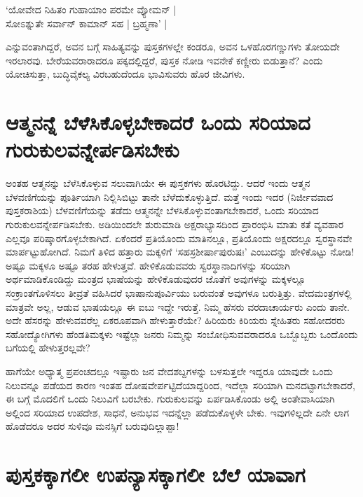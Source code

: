 \begin{shloka}
`ಯೋವೇದ ನಿಹಿತಂ ಗುಹಾಯಾಂ ಪರಮೇ ವ್ಯೋಮನ್ |\label{108}\\
ಸೋಽಶ್ನುತೇ ಸರ್ವಾನ್ ಕಾಮಾನ್ ಸಹ | ಬ್ರಹ್ಮಣಾ' |
\end{shloka}
ಎನ್ನುವಂತಾಗಿದ್ದರೆ, ಅವನ ಬಗ್ಗೆ ಸಾಹಿತ್ಯವನ್ನು ಪುಸ್ತಕಗಳಲ್ಲೇ ಕಂಡರೂ, ಅವನ ಒಳಹೊರಗಣ್ಣುಗಳು ತೋಯದೇ ಇರಲಾರವು. ಬೇರೆಯವರಾರಾದರೂ ಪಕ್ಕದಲ್ಲಿದ್ದರೆ, ಪುಸ್ತಕ ನೋಡಿ ಇವನೇಕೆ ಕಣ್ಣೀರು ಬಿಡುತ್ತಾನೆ? ಎಂದು ಯೋಚಿಸುತ್ತಾ, ಬುದ್ಧಿವೈಕಲ್ಯ ವಿರಬಹುದೆಂದೂ ಭಾವಿಸುವರು ಹೊರ ಜೀವಿಗಳು.

\section*{ಆತ್ಮನನ್ನೆ ಬೆಳೆಸಿಕೊಳ್ಳಬೇಕಾದರೆ ಒಂದು ಸರಿಯಾದ ಗುರುಕುಲವನ್ನೇರ್ಪಡಿಸಬೇಕು}

ಅಂತಹ ಆತ್ಮನನ್ನು ಬೆಳೆಸಿಕೊಳ್ಳುವ ಸಲುವಾಗಿಯೇ ಈ ಪುಸ್ತಕಗಳು ಹೊರಟಿದ್ದು. ಆದರೆ ಇಂದು ಆತ್ಮನ ಬೆಳವಣಿಗೆಯನ್ನು ಪೂರ್ತಿಯಾಗಿ ನಿಲ್ಲಿಸಿಬಿಟ್ಟು ತಾನೇ ಬೆಳೆದುಕೊಳ್ಳುತ್ತಿದೆ. ಮತ್ತೆ ಇಂದು ಇದರ (ನಿರ್ಜೀವವಾದ ಪುಸ್ತಕರಾಶಿಯ) ಬೆಳವಣಿಗೆಯನ್ನು ತಡೆದು ಆತ್ಮನನ್ನೇ ಬೆಳಸಿಕೊಳ್ಳುವಂತಾಗಬೇಕಾದರೆ, ಒಂದು ಸರಿಯಾದ ಗುರುಕುಲವನ್ನೇರ್ಪಡಿಸಬೇಕು. ಅಡಿಯಿಂದಲೇ ಶುರುಮಾಡಿ ಅಕ್ಷರಾಭ್ಯಾಸದಿಂದ ಪ್ರಾರಂಭಿಸಿ ಮಾತು ಕತೆ ವ್ಯವಹಾರ ಎಲ್ಲವೂ ಪರಿಷ್ಕಾರಗೊಳ್ಳಬೇಕಾಗಿದೆ. ಏಕೆಂದರೆ ಪ್ರತಿಯೊಂದು ಮಾತಿನಲ್ಲೂ, ಪ್ರತಿಯೊಂದು ಅಕ್ಷರದಲ್ಲೂ ಸ್ವರಸ್ಥಾನವೇ ಮಾರ್ಪಟ್ಟುಹೋಗಿದೆ. ನಿಮಗೆ ತಿಳಿದ ಹತ್ತಾರು ಮಕ್ಕಳಿಗೆ `ಸಹಸ್ರಶೀರ್ಷಾಪುರುಷಃ' ಎಂಬುದನ್ನು ಹೇಳಿಕೊಟ್ಟು ನೋಡಿ! ಅಷ್ಟೂ ಮಕ್ಕಳೂ ಅಷ್ಟೂ ತರಹ ಹೇಳುತ್ತವೆ. ಹೇಳಿಕೊಡುವವರು ಸ್ವರಸ್ಥಾನಾದಿಗಳನ್ನು ಸರಿಯಾಗಿ ಅರ್ಥಮಾಡಿಕೊಂಡಿದ್ದು ಮಂತ್ರದ ಭಾಷೆಯನ್ನು ಹೇಳಿಕೊಡುವುದರ ಜೊತೆಗೆ ಅವುಗಳನ್ನು ಮಕ್ಕಳಲ್ಲೂ ಸಂಕ್ರಾಂತಗೊಳಿಸಲು ತೀವ್ರತೆ ವಹಿಸಿದರೆ ಭಾಷಾನುಪೂರ್ವಿಯು ಬರುವಂತೆ ಅವುಗಳೂ ಬರುತ್ತಿತ್ತು. ವೇದಮಂತ್ರಗಳಲ್ಲಿ ಮಾತ್ರವೇ ಅಲ್ಲ, ಆಡುವ ಭಾಷಯಲ್ಲೂ ಈ ಐಬು ಇದ್ದೇ ಇರುತ್ತೆ. ನಿಮ್ಮ ಹೆಸರು ವರದಾಚಾರ್ಯರು ಎಂದು ತಾನೇ. ಅದೇ ಹೆಸರನ್ನು ಹೇಳುವವರೆಲ್ಲ ಏಕರೂಪವಾಗಿ ಹೇಳುತ್ತಾರೆಯೇ? ಹಿರಿಯರು ಕಿರಿಯರು ಸ್ನೇಹಿತರು ಸಹೋದರರು ಸಹೋದ್ಯೋಗಿಗಳು ಹೆಂಡತಿಮಕ್ಕಳು ಇಷ್ಟೆಲ್ಲಾ ಜನರು ನಿಮ್ಮನ್ನು ಸಂಬೋಧಿಸುವವರಾದರೂ ಒಬ್ಬೊಬ್ಬರು ಒಂದೊಂದು ಬಗೆಯಲ್ಲಿ ಹೇಳುತ್ತರಲ್ಲವೇ?

ಹಾಗೆಯೇ ಅಧ್ಯಾತ್ಮ  ಪ್ರಪಂಚದಲ್ಲೂ ಇಷ್ಟಾರು ಜನ ವೇದಶಬ್ದಗಳನ್ನು ಬಳಸುತ್ತಲೇ ಇದ್ದರೂ ಯಾವುದೇ ಒಂದು ನಿಲುವನ್ನೂ ಪಡೆಯದ ಕಾರಣ ಇಂತಹ ದೋಷವೇರ್ಪಟ್ಟಿದೆಯಾದ್ದರಿಂದ, ಇದೆಲ್ಲಾ ಸರಿಯಾಗಿ ಮನದಟ್ಟಾಗಬೇಕಾದರೆ, ಈ ಬಗ್ಗೆ ಮೊದಲಿಗೆ ಒಂದು ನಿಲುವಿಗೆ ಬರಬೇಕು. ಗುರುಕುಲವನ್ನು ಏರ್ಪಡಿಸಿಕೊಂಡು ಅಲ್ಲಿ ಅಂತೇವಾಸಿಯಾಗಿ ಅಲ್ಲಿಂದ ಸರಿಯಾದ ಉಪದೇಶ, ಸಾಧನೆ, ಅನುಭವ ಇದನ್ನೆಲ್ಲಾ ಪಡೆದುಕೊಳ್ಳಳೇ ಬೇಕು. ಇವುಗಳಿಲ್ಲದೇ ಏನೇ ಲಾಗ ಹೊಡೆದರೂ ಅದರ ಸುಳಿವೂ ಮನಸ್ಸಿಗೆ ಬರುವುದಿಲ್ಲಾಪ್ಪಾ!

\section*{ಪುಸ್ತಕಕ್ಕಾಗಲೀ ಉಪನ್ಯಾಸಕ್ಕಾಗಲೀ ಬೆಲೆ ಯಾವಾಗ}

